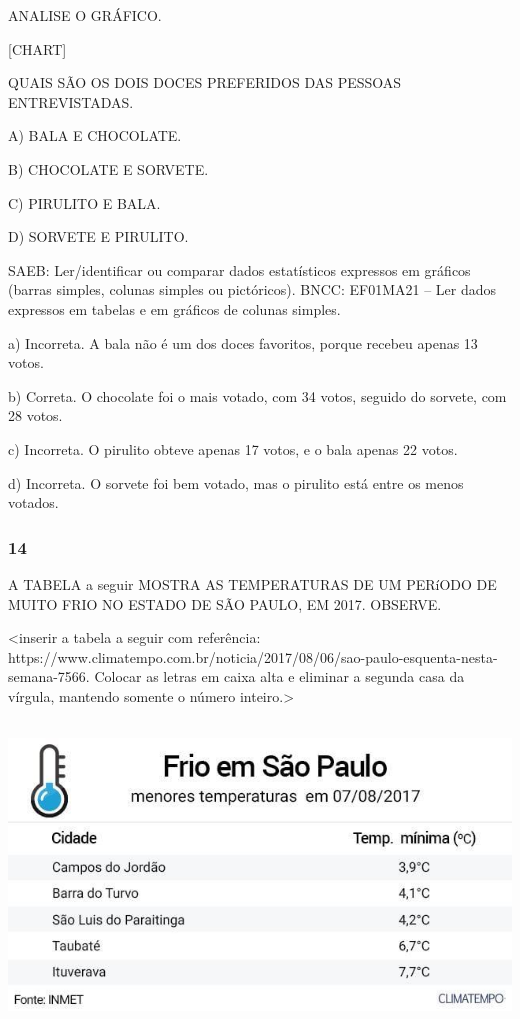 ANALISE O GRÁFICO.

{{[}CHART{]}}

QUAIS SÃO OS DOIS DOCES PREFERIDOS DAS PESSOAS ENTREVISTADAS.

A) BALA E CHOCOLATE.

B) CHOCOLATE E SORVETE.

C) PIRULITO E BALA.

D) SORVETE E PIRULITO.

SAEB: Ler/identificar ou comparar dados estatísticos expressos
em gráficos (barras simples, colunas simples ou pictóricos).
BNCC: EF01MA21 -- Ler dados expressos em tabelas e em gráficos de colunas
simples.

a) Incorreta. A bala não é um dos doces favoritos, porque recebeu apenas 13 votos.

b) Correta. O chocolate foi o mais votado, com 34 votos, seguido do sorvete, com 28 votos.

c) Incorreta. O pirulito obteve apenas 17 votos, e o bala apenas 22 votos.

d) Incorreta. O sorvete foi bem votado, mas o pirulito está entre os menos votados.

\subsubsection{14}\label{section-100}

A TABELA a seguir MOSTRA AS TEMPERATURAS DE UM PERíODO DE MUITO FRIO NO ESTADO DE SÃO
PAULO, EM 2017. OBSERVE.

\textless{}inserir a tabela a seguir com referência:
https://www.climatempo.com.br/noticia/2017/08/06/sao-paulo-esquenta-nesta-semana-7566.
Colocar as letras em caixa alta e eliminar a segunda casa da vírgula,
mantendo somente o número inteiro.\textgreater{}

\includegraphics[width=5.90556in,height=3.20208in]{media/image110.jpg}

